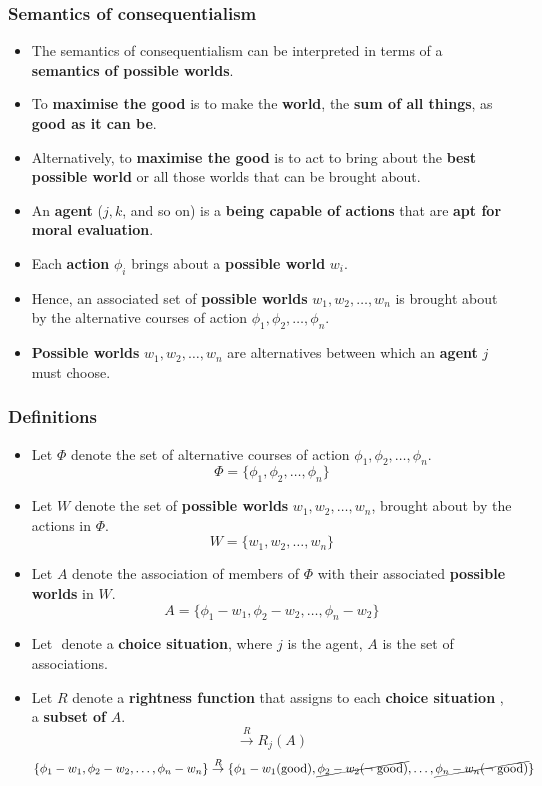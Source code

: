 \documentclass[11pt]{article}
\begin{document}
\subsubsection{Semantics of consequentialism}
\label{sec:org6e2bd45}
\begin{itemize}
\item The semantics of consequentialism can be interpreted in terms of a \textbf{semantics of possible worlds}.
\item To \textbf{maximise the good} is to make the \textbf{world}, the \textbf{sum of all things}, as \textbf{good as it can be}.
\item Alternatively, to \textbf{maximise the good} is to act to bring about the \textbf{best possible world} or all those worlds that can be brought about.
\item An \textbf{agent} (\(j, k\), and so on) is a \textbf{being capable of actions} that are \textbf{apt for moral evaluation}.
\item Each \textbf{action} \(\phi_i\) brings about a \textbf{possible world} \(w_i\).
\item Hence, an associated set of \textbf{possible worlds} \(w_1, w_2, \ldots, w_n\) is brought about by the alternative courses of action \(\phi_1, \phi_2, \ldots, \phi_n\).
\item \textbf{Possible worlds} \(w_1, w_2, \ldots, w_n\) are alternatives between which an \textbf{agent} \(j\) must choose.
\end{itemize}
\subsubsection{Definitions}
\label{sec:org54a3cf9}
\begin{itemize}
\item Let \(\Phi\) denote the set of alternative courses of action \(\phi_1, \phi_2, \ldots, \phi_n\).
\[\Phi = \{\phi_1, \phi_2, \ldots, \phi_n\}\]
\item Let \(W\) denote the set of \textbf{possible worlds} \(w_1, w_2, \ldots, w_n\), brought about by the actions in \(\Phi\).
\[W = \{w_1, w_2, \ldots, w_n\}\]
\item Let \(A\) denote the association of members of \(\Phi\) with their associated \textbf{possible worlds} in \(W\).
\[A = \{\phi_1 - w_1, \phi_2 - w_2, \ldots, \phi_n - w_2\}\]
\item Let \(<j, A>\) denote a \textbf{choice situation}, where \(j\) is the agent, \(A\) is the set of associations.
\item Let \(R\) denote a \textbf{rightness function} that assigns to each \textbf{choice situation} \(<j, A>\), a \textbf{subset of} \(A\).
\[<j, A> \overset{R}{\rightarrow} R_j (A)\]
\[\{\phi_1 - w_1, \phi_2 - w_2, \ldots, \phi_n - w_n\} \overset{R}{\rightarrow} \{\phi_1 - w_1 (\text{good}), \cancel{\phi_2 - w_2 (\neg \text{ good})}, \ldots, \cancel{\phi_n - w_n (\neg \text{ good})}\}\]
\end{itemize}
\end{document}
